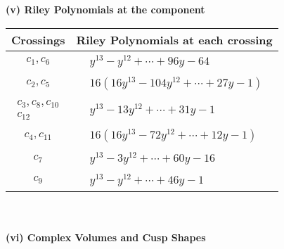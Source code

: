 \documentclass[1p]{elsarticle_modified}
\theoremstyle{definition}
\begin{document}
\newpage\renewcommand{\arraystretch}{1}
\flushleft \textbf{(v) Riley Polynomials at the component}\newline \\
\begin{tabular}{m{50pt}|m{274pt}}
Crossings & \hspace{64pt}Riley Polynomials at each crossing \\
\hline $$\begin{aligned}c_{1},c_{6}\end{aligned}$$&$\begin{aligned}
&y^{13}- y^{12}+\cdots+96 y-64
\end{aligned}$\\
\hline $$\begin{aligned}c_{2},c_{5}\end{aligned}$$&$\begin{aligned}
&16(16 y^{13}-104 y^{12}+\cdots+27 y-1)
\end{aligned}$\\
\hline $$\begin{aligned}c_{3},c_{8},c_{10}\\c_{12}\end{aligned}$$&$\begin{aligned}
&y^{13}-13 y^{12}+\cdots+31 y-1
\end{aligned}$\\
\hline $$\begin{aligned}c_{4},c_{11}\end{aligned}$$&$\begin{aligned}
&16(16 y^{13}-72 y^{12}+\cdots+12 y-1)
\end{aligned}$\\
\hline $$\begin{aligned}c_{7}\end{aligned}$$&$\begin{aligned}
&y^{13}-3 y^{12}+\cdots+60 y-16
\end{aligned}$\\
\hline $$\begin{aligned}c_{9}\end{aligned}$$&$\begin{aligned}
&y^{13}- y^{12}+\cdots+46 y-1
\end{aligned}$\\
\hline
\end{tabular}\\~\\
\newpage\flushleft \textbf{(vi) Complex Volumes and Cusp Shapes}
\end{document}
